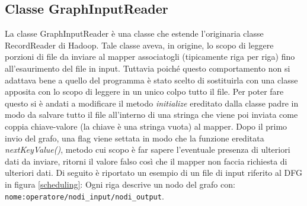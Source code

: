 \documentclass[]{IEEEtran}
\begin{document}
\subsection{Classe GraphInputReader}
La classe GraphInputReader è una classe che estende l'originaria classe RecordReader di Hadoop. Tale classe aveva, in origine, lo scopo di leggere porzioni di file da inviare al mapper associatogli (tipicamente riga per riga) fino all'esaurimento del file in input. Tuttavia poiché questo comportamento non si adattava bene a quello del programma è stato scelto di sostituirla con una classe apposita con lo scopo di leggere in un unico colpo tutto il file. Per poter fare questo si è andati a modificare il metodo \emph{initialize} ereditato dalla classe padre in modo da salvare tutto il file all'interno di una stringa che viene poi inviata come coppia chiave-valore (la chiave è una stringa vuota) al mapper. Dopo il primo invio del grafo, una flag viene settata in modo che la funzione ereditata \emph{nextKeyValue()}, metodo cui scopo è far sapere l'eventuale presenza di ulteriori dati da inviare, ritorni il valore falso così che il mapper non faccia richiesta di ulteriori dati. Di seguito è riportato un esempio di un file di input riferito al DFG in figura \ref{scheduling}: Ogni riga descrive un nodo del grafo con: \texttt{nome:operatore/nodi\_input/nodi\_output}.
\end{document}
